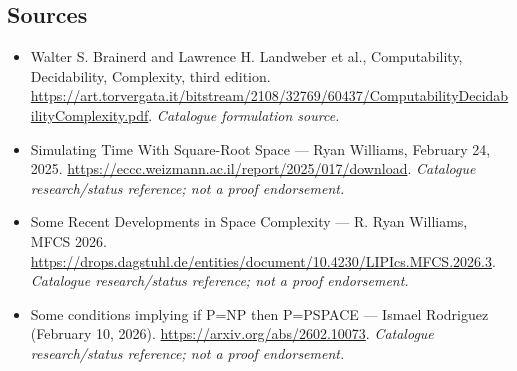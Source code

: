 \documentclass[11pt,a4paper]{article}
\begin{document}
\subsection{Sources}
\begin{itemize}\raggedright
\item[\textnormal{[S1]}]\hypertarget{source:3402:1}{} Walter S. Brainerd and Lawrence H. Landweber et al., Computability, Decidability, Complexity, third edition.
\url{https://art.torvergata.it/bitstream/2108/32769/60437/ComputabilityDecidabilityComplexity.pdf}.
{\small\textit{Catalogue formulation source.}}
\item[\textnormal{[S2]}]\hypertarget{source:3402:2}{} Simulating Time With Square-Root Space — Ryan Williams, February 24, 2025.
\url{https://eccc.weizmann.ac.il/report/2025/017/download}.
{\small\textit{Catalogue research/status reference; not a proof endorsement.}}
\item[\textnormal{[S3]}]\hypertarget{source:3402:3}{} Some Recent Developments in Space Complexity — R. Ryan Williams, MFCS 2026.
\url{https://drops.dagstuhl.de/entities/document/10.4230/LIPIcs.MFCS.2026.3}.
{\small\textit{Catalogue research/status reference; not a proof endorsement.}}
\item[\textnormal{[S4]}]\hypertarget{source:3402:4}{} Some conditions implying if P=NP then P=PSPACE — Ismael Rodriguez (February 10, 2026).
\url{https://arxiv.org/abs/2602.10073}.
{\small\textit{Catalogue research/status reference; not a proof endorsement.}}
\end{itemize}

\end{document}
